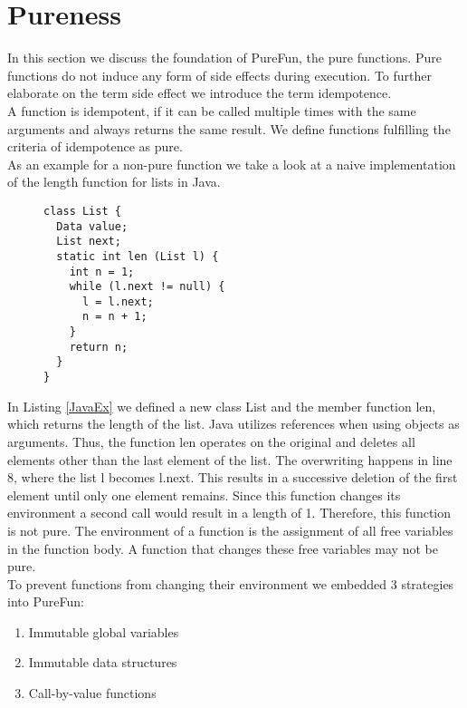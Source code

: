 \section{Pureness}
In this section we discuss the foundation of PureFun, the pure functions. Pure functions do not induce any form of side effects during execution. To further elaborate on the term side effect we introduce the term idempotence.\\
A function is idempotent, if it can be called multiple times with the same arguments and always returns the same result. We define functions fulfilling  the criteria of idempotence as pure.\\
As an example for a non-pure function we take a look at a naive implementation of the length function for lists in Java. 
\begin{figure}[h]
\begin{lstlisting}[caption={Java code that deletes its input list as a side effect.},label={JavaEx}]
class List {
  Data value;
  List next;
  static int len (List l) {
    int n = 1;
    while (l.next != null) {
      l = l.next;
      n = n + 1;
    }
    return n;
  }
}
\end{lstlisting}
\end{figure}
In Listing \ref{JavaEx} we defined a new class List and the member function len, which returns the length of the list. Java utilizes references when using objects as arguments. Thus, the function len operates on the original and deletes all elements other than the last element of the list. The overwriting happens in line 8, where the list l becomes l.next. This results in a successive deletion of the first element until only one element remains. Since this function changes its environment a second call would result in a length of 1. Therefore, this function is not pure. The environment of a function is the assignment of all free variables in the function body. A function that changes these free variables may not be pure.\\
To prevent functions from changing their environment we embedded 3 strategies into PureFun:
\begin{enumerate}
\item Immutable global variables
\item Immutable data structures
\item Call-by-value functions
\end{enumerate}
